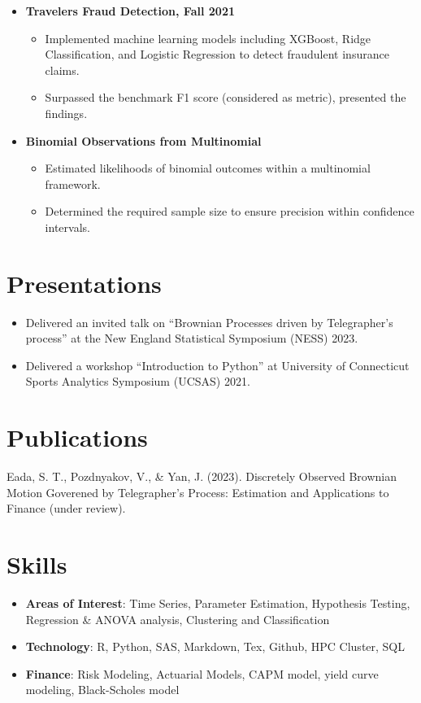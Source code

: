 \documentclass[letterpaper,11pt]{article}
\begin{document}
\begin{itemize}

\item \textbf{Travelers Fraud Detection, Fall 2021}
    \begin{itemize}
        \item Implemented machine learning models including XGBoost, Ridge Classification, and Logistic Regression to detect fraudulent insurance claims.
        \item Surpassed the benchmark F1 score (considered as metric),
        presented the findings.
    \end{itemize}\vspace{-5pt}

\item \textbf{Binomial Observations from Multinomial}
    \begin{itemize}
        \item Estimated likelihoods of binomial outcomes within a multinomial framework.
        \item Determined the required sample size to ensure precision within confidence intervals.
    \end{itemize}\vspace{-5pt}
\end{itemize}\vspace{-5pt}

\section*{Presentations}

\begin{itemize}
    \item Delivered an invited talk on ``Brownian Processes driven by
    Telegrapher's process'' at the New England Statistical Symposium (NESS) 2023.
    \item Delivered a workshop ``Introduction to Python'' at
    University of Connecticut Sports Analytics Symposium (UCSAS) 2021.
\end{itemize}

\section*{Publications}
Eada, S. T., Pozdnyakov, V., \& Yan, J. (2023). Discretely
Observed Brownian Motion Goverened by Telegrapher's Process:
Estimation and Applications to Finance (under review).

\section*{Skills}
    \begin{itemize}
        \item \textbf{Areas of Interest}: Time Series, Parameter Estimation, Hypothesis Testing, Regression \& ANOVA analysis, Clustering and Classification
        \item \textbf{Technology}: R, Python, SAS, Markdown, Tex,
        Github, HPC Cluster, SQL
        \item \textbf{Finance}: Risk Modeling, Actuarial Models, CAPM model, yield curve modeling, Black-Scholes model
    \end{itemize}     
\end{document}
